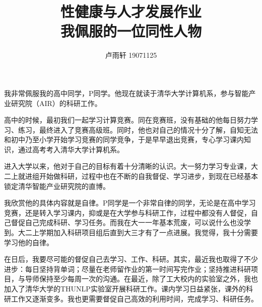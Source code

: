 \documentclass{ctexart}
\title{性健康与人才发展作业 \\[.4em] \large 我佩服的一位同性人物}
\author{卢雨轩 19071125}
\begin{document}
\maketitle
我非常佩服我的高中同学，P同学。他现在就读于清华大学计算机系，参与智能产业研究院（AIR）的科研工作。

高中的时候，最初我们一起学习计算竞赛。同在竞赛班，没有基础的他每日努力学习、练习，最终进入了竞赛高级班。同时，他也对自己的情况十分了解，自知无法和初中乃至小学开始学习竞赛的同学竞争，于是早早退出竞赛，专心学习课内知识，通过高考考入清华大学计算机系。

进入大学以来，他对于自己的目标有着十分清晰的认识。大一努力学习专业课，大二上就进组开始做科研，过程中也在不断的自我督促、学习进步，到现在已经基本锁定清华智能产业研究院的直博。

我欣赏他的具体内容就是自律。P同学是一个非常自律的同学，无论是在高中学习竞赛，还是转入学习课内，抑或是在大学参与科研工作，过程中都没有人督促，自己督促自己完成科研、学习任务。而我在大一一年基本荒废，可以说什么也没学到。大二上学期加入科研项目组后直到大三才有了一点进展。我觉得，我十分需要学习他的自律。

在日后，我要尽可能的督促自己去学习、工作、科研。其实，最近我也取得了不少进步：每日坚持背单词；尽量在老师留作业的第一时间写完作业；坚持推进科研项目，与导师保持至少每周一次的沟通。在最近，除了工大校内的实验室之外，我也加入了清华大学的THUNLP实验室开展科研工作。课内学习日益紧张，课外的科研工作又逐渐变多。我也更需要督促自己高效的利用时间，完成学习、科研任务。
\end{document}

